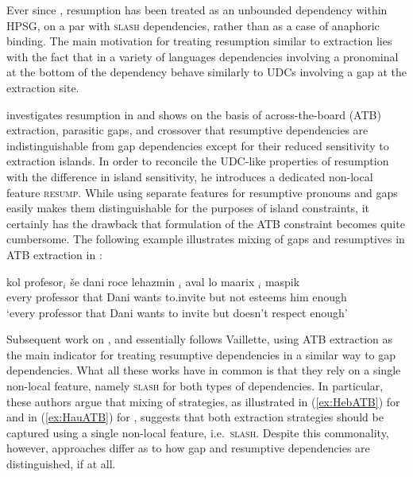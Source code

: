 \documentclass[output=paper
,notxmath 
	        ,collection
	        ,collectionchapter
 	        ,biblatex
                ,babelshorthands
                ,newtxmath
                ,draftmode
                ,colorlinks, citecolor=brown
]{langscibook}
\begin{document}
Ever since \citet{Vaillette:01}, resumption has been treated as an unbounded dependency within HPSG, on a par with \textsc{slash} dependencies, rather than as a case of anaphoric binding. The main motivation for treating resumption similar to extraction lies with the fact that in a variety of languages dependencies involving a pronominal at the bottom of the dependency behave similarly to UDCs involving a gap at the extraction site. 

\citet{Vaillette:01} investigates resumption in  and shows on
the basis of across-the-board (ATB) extraction, parasitic gaps, and
crossover that resumptive dependencies are indistinguishable from gap
dependencies except for their reduced sensitivity to extraction
islands. In order to reconcile the UDC-like properties of resumption
with the difference in island sensitivity, he introduces a dedicated
non-local feature \textsc{resump}. While using separate features for
resumptive pronouns and gaps easily makes them distinguishable for the
purposes of island constraints, it certainly has the drawback that
formulation of the ATB constraint becomes quite cumbersome.
The following example illustrates mixing of gaps and resumptives in
ATB extraction in : 

\begin{exe}
  \ex \label{ex:HebATB}{
\gll kol profesor$_i$ še dani roce lehazmin \trace{}$_i$ aval lo maarix $_i$ maspik\footnotemark\\
     every professor that Dani wants to.invite {} but not esteems him enough\\
\glt `every professor that Dani wants to invite but doesn't respect enough'
}
\end{exe}

\noindent
Subsequent work on  \citep{taghvaipour:phd:05}, 
\citep{Borsley:13} and  \citep{Crysmann:12} essentially follows
Vaillette, using ATB extraction as the main indicator for treating
resumptive dependencies in a similar way to gap dependencies. What all these
works have in common is that they rely on a single non-local
feature, namely \textsc{slash} for both types of dependencies. In
particular, these authors argue that mixing of strategies, as
illustrated in (\ref{ex:HebATB}) for  and in (\ref{ex:HauATB})
for , suggests that both extraction
strategies should be captured using a single non-local feature,
i.e.\ \textsc{slash}. Despite this commonality, however, approaches
differ as to how gap and resumptive dependencies are distinguished, if
at all.
\end{document}
